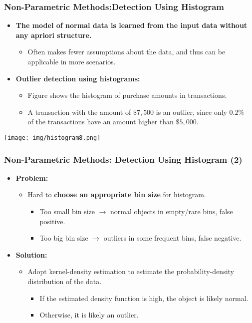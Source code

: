 \begin{frame}
	\frametitle{Non-Parametric Methods:Detection Using Histogram}
	\begin{itemize}
		\item \textbf{The model of normal data is learned from the input data without any apriori structure.}
		      \begin{itemize}
			      \item Often makes fewer assumptions about the data, and thus can be applicable in more scenarios.
		      \end{itemize}
		\item \textbf{Outlier detection using histograms:}
		      \begin{itemize}
			      \item Figure shows the histogram of purchase amounts in transactions.
			      \item A transaction with the amount of $\$7,500$ is an outlier, since only $0.2\%$ \\ of the transactions have an amount higher than $\$5,000$.
		      \end{itemize}
	\end{itemize}
	\centering
	\vspace{0.2cm}
	\texttt{[image: img/histogram8.png]}
\end{frame}


\begin{frame}
	\frametitle{Non-Parametric Methods: Detection Using Histogram (2)}
	\begin{itemize}
		\item \textbf{Problem:}
		      \begin{itemize}
			      \item Hard to \textbf{\color{airforceblue}choose an appropriate bin size} for histogram.
			            \begin{itemize}
				            \item Too small bin size $\rightarrow$ normal objects in empty/rare bins, false positive.
				            \item Too big bin size $\rightarrow$ outliers in some frequent bins, false negative.
			            \end{itemize}
		      \end{itemize}
		\item \textbf{Solution:}
		      \begin{itemize}
			      \item Adopt kernel-density estimation to estimate the probability-density distribution of the data.
			            \begin{itemize}
				            \item If the estimated density function is high, the object is likely normal.
				            \item Otherwise, it is likely an outlier.
			            \end{itemize}
		      \end{itemize}
	\end{itemize}
\end{frame}
